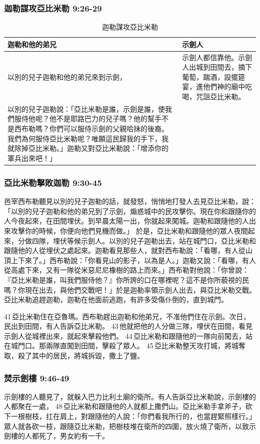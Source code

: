 \subsubsection{迦勒謀攻亞比米勒 9:26-29}
\begin{table}[H]
\centering
\begin{tabular}{p{8.85cm}|p{8.2cm}}\hline\hline
迦勒和他的弟兄&示劍人\\\hline
以別的兒子迦勒和他的弟兄來到示劍，
&示劍人都信靠他。示劍人出城到田間去，摘下葡萄，踹酒，設擺筵宴，進他們神的廟中吃喝，咒詛亞比米勒。\\\hline
以別的兒子迦勒說：「亞比米勒是誰，示劍是誰，使我們服侍他呢？他不是耶路巴力的兒子嗎？他的幫手不是西布勒嗎？你們可以服侍示劍的父親哈抹的後裔。我們為何服侍亞比米勒呢？唯願這民歸我的手下，我就除掉亞比米勒。」迦勒又對亞比米勒說：「增添你的軍兵出來吧！」&\\\hline
 \end{tabular}
\caption{迦勒謀攻亞比米勒}
\end{table}  


\subsubsection{亞比米勒擊敗迦勒 9:30-45}
邑宰西布勒聽見以別的兒子迦勒的話，就發怒，悄悄地打發人去見亞比米勒，說：「以別的兒子迦勒和他的弟兄到了示劍，煽惑城中的民攻擊你。現在你和跟隨你的人今夜起來，在田間埋伏。到早晨太陽一出，你就起來闖城。迦勒和跟隨他的人出來攻擊你的時候，你便向他們見機而做。」
於是，亞比米勒和跟隨他的眾人夜間起來，分做四隊，埋伏等候示劍人。以別的兒子迦勒出去，站在城門口，亞比米勒和跟隨他的人從埋伏之處起來。迦勒看見那些人，就對西布勒說：「看哪，有人從山頂上下來了。」西布勒說：「你看見山的影子，以為是人。」迦勒又說：「看哪，有人從高處下來，又有一隊從米惡尼尼橡樹的路上而來。」西布勒對他說：「你曾說：『亞比米勒是誰，叫我們服侍他？』你所誇的口在哪裡呢？這不是你所藐視的民嗎？你現在出去，與他們交戰吧！」於是迦勒率領示劍人出去，與亞比米勒交戰。亞比米勒追趕迦勒，迦勒在他面前逃跑，有許多受傷仆倒的，直到城門。

41 亞比米勒住在亞魯瑪。西布勒趕出迦勒和他弟兄，不准他們住在示劍。次日，民出到田間，有人告訴亞比米勒。 43 他就把他的人分做三隊，埋伏在田間，看見示劍人從城裡出來，就起來擊殺他們。 44 亞比米勒和跟隨他的一隊向前闖去，站在城門口。那兩隊直闖到田間，擊殺了眾人。 45 亞比米勒整天攻打城，將城奪取，殺了其中的居民，將城拆毀，撒上了鹽。

\subsubsection{焚示劍樓 9:46-49}
示劍樓的人聽見了，就躲入巴力比利土廟的衛所。有人告訴亞比米勒說，示劍樓的人都聚在一處， 48 亞比米勒和跟隨他的人就都上撒們山。亞比米勒手拿斧子，砍下一根樹枝，扛在肩上，對跟隨他的人說：「你們看我所行的，也當趕緊照樣行。」眾人就各砍一枝，跟隨亞比米勒，把樹枝堆在衛所的四圍，放火燒了衛所，以致示劍樓的人都死了，男女約有一千。

